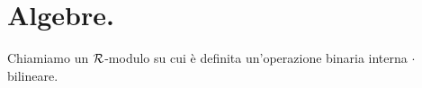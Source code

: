 \section{Algebre.}
\label{Moduli_Algebre}
\begin{Definition}
	Chiamiamo  un $\mathcal{R}$-modulo su cui \`e definita un'operazione binaria interna $\cdot$ bilineare.
\end{Definition}
